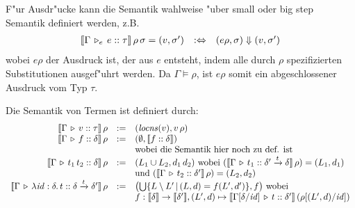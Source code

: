 \documentclass[12pt,a4paper,bigheadings]{scrartcl}
\newcommand{\semantic}[1]{\ensuremath{\llbracket#1\rrbracket}}
\newcommand{\locns}{\name{locns}}
\newcommand{\tto}{\ensuremath{\xrightarrow{t}}}
\newcommand{\Tje}[3]{#1 \,\tr_e\, #2\cc#3}
\begin{document}
\noindent
F"ur Ausdr"ucke kann die Semantik wahlweise "uber small oder big step Semantik definiert
werden, z.B.
\[\begin{array}{rcl}
  \semantic{\Tje{\Gamma}{e}{\tau}}\,\rho\,\sigma = (v,\sigma')
  & :\Leftrightarrow &
  (e\rho,\sigma) \Downarrow (v,\sigma')
\end{array}\]
wobei $e \rho$ der Ausdruck ist, der aus $e$ entsteht, indem alle durch $\rho$ spezifizierten
Substitutionen ausgef"uhrt werden. Da $\Gamma \models \rho$, ist $e \rho$ somit ein abgeschlossener
Ausdruck vom Typ $\tau$.

\pagebreak[3] \noindent
Die Semantik von Termen ist definiert durch:
\[\begin{array}{rcl}
  \semantic{\Tj{\Gamma}{v}{\tau}}\,\rho
  & := &
  (\locns(v), v\,\rho)
  \\
  \semantic{\Tj{\Gamma}{f}{\delta}}\,\rho
  & := &
  (\emptyset,\semantic{\tj{f}{\delta}}) \\
  && \text{wobei die Semantik hier noch zu def. ist}
  \\
  \semantic{\Tj{\Gamma}{\app{t_1}{t_2}}{\delta}}\,\rho
  & := &
  (L_1 \cup L_2, d_1\,d_2) \text{ wobei } (\semantic{\Tj{\Gamma}{t_1}{\delta'\tto\delta}}\,\rho) = (L_1,d_1) \\
  && \text{und } (\semantic{\Tj{\Gamma}{t_2}{\delta'}}\,\rho) = (L_2,d_2)
  \\
  \semantic{\Tj{\Gamma}{\abstr{\id:\delta}{t}}{\delta\tto\delta'}}\,\rho
  & := & \bigl(\bigcup \{ L\setminus L' \,|\,(L,d) = f(L',d') \}, f\bigr) \text{ wobei} \\
  && f: \semantic{\delta} \to \semantic{\delta'}, (L',d) \mapsto \semantic{\Tj{\Gamma[\delta/\id]}{t}{\delta'}}\,(\rho[(L',d)/\id])
\end{array}\]
\end{document}

